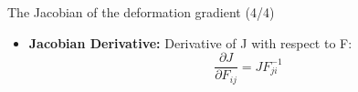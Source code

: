 \documentclass{beamer}
\begin{document}
\begin{frame}{The Jacobian of the deformation gradient (4/4)}
\begin{itemize}
    \item \textbf{Jacobian Derivative:} Derivative of J with respect to F:
        \[
        \frac{\partial J}{\partial F_{ij}} = J F_{ji}^{-1}
        \]
\end{itemize}
\end{frame}

  
\end{document}
